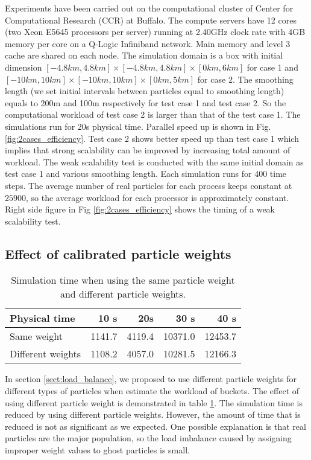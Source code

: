 Experiments have been carried out on the computational cluster of Center for Computational Research (CCR) at Buffalo. 
The compute servers have 12 cores (two Xeon E5645 processors per server) running at 2.40GHz clock rate with 4GB memory per core on a Q-Logic Infiniband network. Main memory and level 3 cache are shared on each node. The simulation domain is a box with initial dimension $[-4.8km, 4.8km]\times [-4.8km, 4.8km] \times [0km, 6km]$ for case 1 and $[-10km, 10km]\times [-10km, 10km] \times [0km, 5km]$ for case 2. The smoothing length (we set initial intervals between particles equal to smoothing length) equals to 200m and 100m respectively for test case 1 and test case 2. So the computational workload of test case 2 is larger than that of the test case 1. The simulations run for 20s physical time.  Parallel speed up is shown in Fig. \ref{fig:2cases_efficiency}. Test case 2 shows better speed up than test case 1 which implies that strong scalability can be improved by increasing total amount of workload.
The weak scalability test is conducted with the same initial domain as test case 1 and various smoothing length. Each simulation runs for 400 time steps. The average number of real particles for each process keeps constant at $25900$, so the average workload for each processor is approximately constant. 
Right side figure in Fig \ref{fig:2cases_efficiency} shows the timing of a weak scalability test.

\subsection{Effect of calibrated particle weights} \label{sec:effect-of-calibrated-particle-weights}

\begin{table}
\centering
      \caption{Simulation time when using the same particle weight and different particle weights.} 
	  \begin{tabular}{lrrrr}
	    \hline
	    Physical time & 10 s & 20s & 30 s & 40 s \\
	    \hline
	    Same weight & 1141.7 & 4119.4 & 10371.0 & 12453.7\\
	    Different weights & 1108.2 & 4057.0 & 10281.5 & 12166.3\\
	    \hline
	  \end{tabular}
	  \label{tab:same_diff_particle_weight}
\end{table}

In section \ref{sect:load_balance}, we proposed to use different particle weights for different types of particles when estimate the workload of buckets. The effect of using different particle weight is demonstrated in table \ref{tab:same_diff_particle_weight}. The simulation time is reduced by using different particle weights. However, the amount of time that is reduced is not as significant as we expected. One possible explanation is that real particles are the major population, so the load imbalance caused by assigning improper weight values to ghost particles is small.


